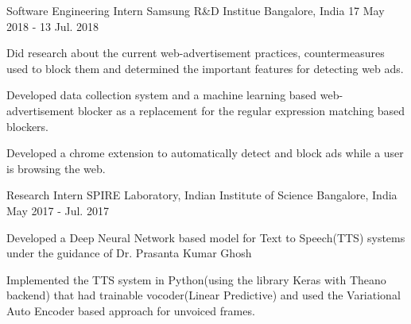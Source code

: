 

\begin{cventries}

  \cventry
    {Software Engineering Intern} %
    {Samsung R\&D Institue} %
    {Bangalore, India} %
    {17 May 2018 - 13 Jul. 2018} %
    {
      \begin{cvitems} %
        \item {Did research about the current web-advertisement practices, countermeasures used to block them and determined the
important features for detecting web ads.}
        \item {Developed data collection system and a machine learning based web-advertisement blocker as a replacement for the regular expression matching
based blockers.}
        \item {Developed a chrome extension to automatically detect and block ads while a user is browsing the web.}
      \end{cvitems}
    }

  \cventry
    {Research Intern} %
    {SPIRE Laboratory, Indian Institute of Science} %
    {Bangalore, India} %
    {May 2017 - Jul. 2017} %
    {
      \begin{cvitems} %
        \item {Developed a Deep Neural Network based model for Text to Speech(TTS) systems under the guidance of Dr. Prasanta Kumar Ghosh}
        \item {Implemented the TTS system in Python(using the library Keras with Theano backend) that had trainable vocoder(Linear
Predictive) and used the Variational Auto Encoder based approach for unvoiced frames.}
      \end{cvitems}
    }


\end{cventries}
